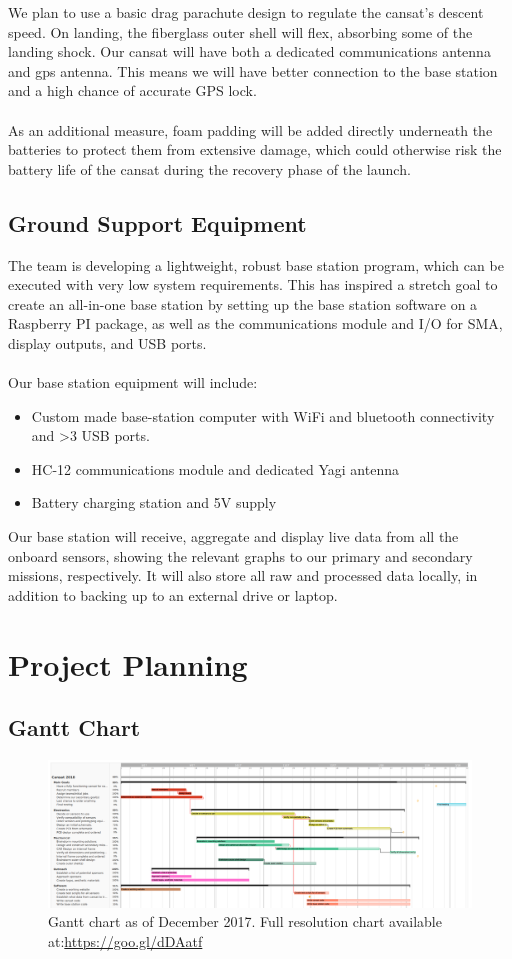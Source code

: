 \documentclass{report}
\begin{document}
		We plan to use a basic drag parachute design to regulate the cansat’s 
		descent speed. On landing, the fiberglass outer shell will flex, absorbing 
		some of the landing shock. Our cansat will have both a dedicated
		communications antenna and gps antenna. This means we will have 
		better connection to the base station and a high chance of accurate GPS lock.
		\\\\
		{\color{blue}As an additional measure, foam padding will be added 
		directly underneath the batteries to protect them from extensive damage, which
		could otherwise risk the battery life of the cansat during the recovery phase of
		the launch.}

	\section{Ground Support Equipment}
		The team is developing a lightweight, robust base station program, which 
		can be executed with very low system requirements. This has inspired a
		stretch goal to create an all-in-one base station by setting up the base 
		station software on a Raspberry PI package, as well as the communications
		module and I/O for SMA, display outputs, and USB ports.
		\\\\
		Our base station equipment will include:
		\begin{itemize}
			\item Custom made base-station computer with WiFi and bluetooth
			connectivity and >3 USB ports.
			\item HC-12 communications module and dedicated Yagi antenna
			\item Battery charging station and 5V supply
		\end{itemize}
		Our base station will receive, aggregate and display live data
		from all the onboard sensors, showing the relevant graphs to our primary
		and secondary missions, respectively. It will also store all raw and 
		processed data locally, in addition to backing up to an external drive or 
		laptop.
	

\chapter{Project Planning}
	\section{Gantt Chart}
	\begin{figure}[h]
		\centering
		\includegraphics[width=\textwidth]{ganttDec.PNG}
		\caption{Gantt chart as of December 2017. Full resolution chart 
		available at:\url{https://goo.gl/dDAatf}}
	\end{figure}
	
\end{document}

